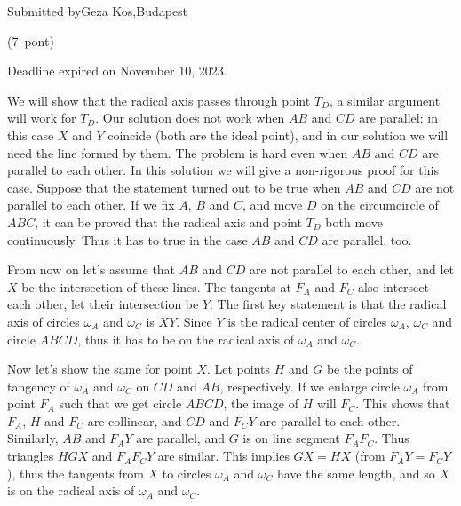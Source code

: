 \documentclass{article}
\begin{document}
Submitted byGeza Kos,Budapest

(7 pont)

Deadline expired on November 10, 2023.

We will show that the radical axis passes through point \(\displaystyle T_D\), a similar argument will work for \(\displaystyle T_D\). Our solution does not work when \(\displaystyle AB\) and \(\displaystyle CD\) are parallel: in this case \(\displaystyle X\) and \(\displaystyle Y\) coincide (both are the ideal point), and in our solution we will need the line formed by them. The problem is hard even when \(\displaystyle AB\) and \(\displaystyle CD\) are parallel to each other. In this solution we will give a non-rigorous proof for this case. Suppose that the statement turned out to be true when \(\displaystyle AB\) and \(\displaystyle CD\) are not parallel to each other. If we fix \(\displaystyle A\), \(\displaystyle B\) and \(\displaystyle C\), and move \(\displaystyle D\) on the circumcircle of \(\displaystyle ABC\), it can be proved that the radical axis and point \(\displaystyle T_D\) both move continuously. Thus it has to true in the case \(\displaystyle AB\) and \(\displaystyle CD\) are parallel, too.

From now on let's assume that \(\displaystyle AB\) and \(\displaystyle CD\) are not parallel to each other, and let \(\displaystyle X\) be the intersection of these lines. The tangents at \(\displaystyle F_A\) and \(\displaystyle F_C\) also intersect each other, let their intersection be \(\displaystyle Y\). The first key statement is that the radical axis of circles \(\displaystyle \omega_A\) and \(\displaystyle \omega_C\) is \(\displaystyle XY\). Since \(\displaystyle Y\) is the radical center of circles \(\displaystyle \omega_A\), \(\displaystyle \omega_C\) and circle \(\displaystyle ABCD\), thus it has to be on the radical axis of \(\displaystyle \omega_A\) and \(\displaystyle \omega_C\).

Now let's show the same for point \(\displaystyle X\). Let points \(\displaystyle H\) and \(\displaystyle G\) be the points of tangency of \(\displaystyle \omega_A\) and \(\displaystyle \omega_C\) on \(\displaystyle CD\) and \(\displaystyle AB\), respectively. If we enlarge circle \(\displaystyle \omega_A\) from point \(\displaystyle F_A\) such that we get circle \(\displaystyle ABCD\), the image of \(\displaystyle H\) will \(\displaystyle F_C\). This shows that \(\displaystyle F_A\), \(\displaystyle H\) and \(\displaystyle F_C\) are collinear, and \(\displaystyle CD\) and \(\displaystyle F_CY\) are parallel to each other. Similarly, \(\displaystyle AB\) and \(\displaystyle F_AY\) are parallel, and \(\displaystyle G\) is on line segment \(\displaystyle F_AF_C\). Thus triangles \(\displaystyle HGX\) and \(\displaystyle F_AF_CY\) are similar. This implies \(\displaystyle GX=HX\) (from \(\displaystyle F_AY=F_CY\)), thus the tangents from \(\displaystyle X\) to circles \(\displaystyle \omega_A\) and \(\displaystyle \omega_C\) have the same length, and so \(\displaystyle X\) is on the radical axis of \(\displaystyle \omega_A\) and \(\displaystyle \omega_C\).
\end{document}
